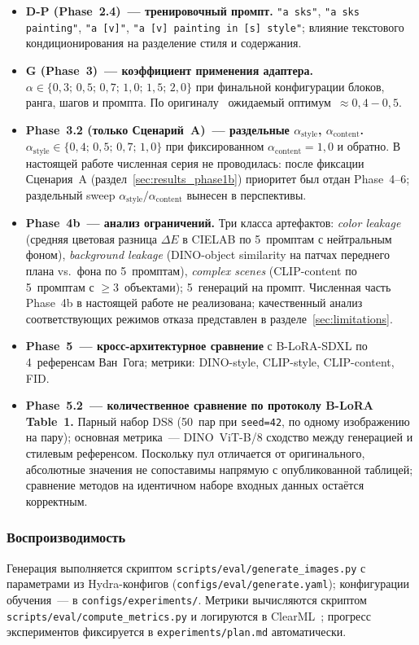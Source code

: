 \begin{itemize}
    \item \textbf{D-P (Phase~2.4)~--- тренировочный промпт.} \texttt{"a sks"}, \texttt{"a sks painting"}, \texttt{"a [v]"}, \texttt{"a [v] painting in [s] style"}; влияние текстового кондиционирования на разделение стиля и содержания.

    \item \textbf{G (Phase~3)~--- коэффициент применения адаптера.} $\alpha \in \{0{,}3;\, 0{,}5;\, 0{,}7;\, 1{,}0;\, 1{,}5;\, 2{,}0\}$ при финальной конфигурации блоков, ранга, шагов и промпта. По оригиналу~\cite{frenkel2024blora} ожидаемый оптимум~$\approx 0{,}4{-}0{,}5$.

    \item \textbf{Phase~3.2 (только Сценарий~A)~--- раздельные $\alpha_\text{style}$, $\alpha_\text{content}$.} $\alpha_\text{style} \in \{0{,}4;\, 0{,}5;\, 0{,}7;\, 1{,}0\}$ при фиксированном $\alpha_\text{content}{=}1{,}0$ и обратно. В настоящей работе численная серия не проводилась: после фиксации Сценария~A (раздел~\ref{sec:results_phase1b}) приоритет был отдан Phase~4--6; раздельный sweep $\alpha_\text{style}/\alpha_\text{content}$ вынесен в перспективы.

    \item \textbf{Phase~4b~--- анализ ограничений.} Три класса артефактов: \textit{color leakage} (средняя цветовая разница $\Delta E$ в CIELAB по 5~промптам с нейтральным фоном), \textit{background leakage} (DINO-object similarity на патчах переднего плана vs.\ фона по 5~промптам), \textit{complex scenes} (CLIP-content по 5~промптам с $\geq 3$~объектами); 5~генераций на промпт. Численная часть Phase~4b в настоящей работе не реализована; качественный анализ соответствующих режимов отказа представлен в разделе~\ref{sec:limitations}.

    \item \textbf{Phase~5~--- кросс-архитектурное сравнение} с B-LoRA-SDXL по 4~референсам Ван~Гога; метрики: DINO-style, CLIP-style, CLIP-content, FID.

    \item \textbf{Phase~5.2~--- количественное сравнение по протоколу B-LoRA Table~1.} Парный набор DS8 (50~пар при \texttt{seed=42}, по одному изображению на пару); основная метрика~--- DINO~ViT-B/8 сходство между генерацией и стилевым референсом. Поскольку пул отличается от оригинального, абсолютные значения не сопоставимы напрямую с опубликованной таблицей; сравнение методов на идентичном наборе входных данных остаётся корректным.
\end{itemize}

\subsubsection*{Воспроизводимость}

Генерация выполняется скриптом \texttt{scripts/eval/generate\_images.py} с параметрами из Hydra-конфигов (\texttt{configs/eval/generate.yaml}); конфигурации обучения~--- в \texttt{configs/experiments/}. Метрики вычисляются скриптом \texttt{scripts/eval/compute\_metrics.py} и логируются в ClearML~\cite{clearml2024}; прогресс экспериментов фиксируется в \texttt{experiments/plan.md} автоматически.
